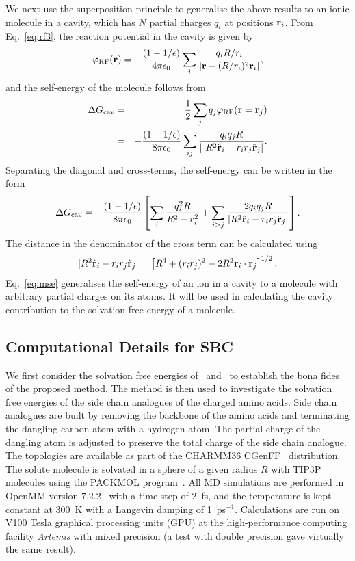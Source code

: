 We next use the superposition principle to generalise the above results to an ionic molecule in a 
cavity, which has $N$ partial charges $q_i$ at positions ${\bf r}_i$. From Eq.~\eqref{eq:rf3}, the 
reaction potential in the cavity is given by
\begin{equation}
\varphi_{\text{RF}} ({\bf r}) = -\frac{(1-1/\epsilon)}{4\pi\epsilon_0} 
\sum_{i} \frac{ q_i R/r_i}{|{\bf r} - (R/r_i)^2 {\bf r}_i |},
\end{equation}
and the self-energy of the molecule follows from
\begin{eqnarray}
\Delta G_{\text{cav}} &=& \frac{1}{2}\sum_{j}q_j\varphi_{\text{RF}}({\bf r} = 
{\bf r}_j ) \nonumber\\
&=& -\frac{(1-1/\epsilon)}{8\pi\epsilon_{0}} \sum_{ij} 
\frac{q_i q_j R}{|\ R^2\hat{\bf r}_i -r_i r_j \hat{\bf r}_j |}.
\end{eqnarray}
Separating the diagonal and cross-terms, the self-energy can be written in the form
\begin{equation}
\Delta G_{\text{cav}} = 
-\frac{(1-1/\epsilon)}{8\pi\epsilon_{0}}
\left[\sum_{i}\frac{q_{i}^2 R}{R^2 - r_{i}^2} 
+ \sum_{i>j}\frac{2q_i q_j 
R}{|R^2\hat{\bf r}_{i}-r_{i}r_{j}\hat{\bf r}_{j}|}\right].
\label{eq:mse}
\end{equation}
The distance in the denominator of the cross term can be calculated using 
\begin{equation}
| R^2 \hat{\bf r}_{i}-r_{i}r_{j}\hat{\bf r}_{j}|= \left[R^4 + (r_{i}r_{j})^2 - 
2R^2 {\bf r}_i \cdot {\bf r}_j\right]^{1/2}.
\end{equation}
Eq.~\eqref{eq:mse} generalises the self-energy of an ion in a cavity to a molecule with arbitrary 
partial charges on its atoms. It will be used in calculating the cavity contribution to the solvation 
free energy of a molecule.

\subsection{Computational Details for SBC}
We first consider the solvation free energies of \Na\ and \Cl\ to establish the bona fides of the 
proposed method. The method is then used to investigate the solvation free energies of the side chain 
analogues of the charged amino acids. Side chain analogues are built by removing the backbone of the 
amino acids and terminating the dangling carbon atom with a hydrogen atom. The partial charge of the 
dangling atom is adjusted to preserve the total charge of the side chain analogue. The topologies are 
available as part of the CHARMM36 CGenFF~\cite{Brooks2009} distribution. The solute molecule is solvated 
in a sphere of a given radius $R$ with TIP3P~\cite{Jorgensen1983,Neria1996} molecules using the PACKMOL 
program~\cite{Martinez2009}. All MD simulations are performed in OpenMM version 7.2.2~\cite{Eastman2016} 
with a time step of 2~fs, and the temperature is kept constant at 300~K with a Langevin damping of 
1~ps$^{-1}$. Calculations are run on V100 Tesla graphical processing units (GPU) at the high-performance 
computing facility {\it Artemis} with mixed precision (a test with double precision gave virtually the 
same result). 

